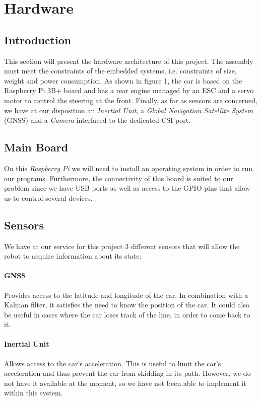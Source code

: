 \section{Hardware}

\subsection{Introduction}

This section will present the hardware architecture of this project. The assembly must meet the constraints of the embedded
systems, i.e. constraints of size, weight and power consumption. As shown in
figure 1, the car is based on the Raspberry Pi 3B+ board and has a rear engine
managed by an ESC and a servo motor to control the steering at the front. Finally,
as far as sensors are concerned, we have at our disposition an \textit{Inertial Unit}, a 
\textit{Global Navigation Satellite System} (GNSS) and a \textit{Camera}
interfaced to the dedicated CSI port.


\subsection{Main Board}

On this \textit{Raspberry Pi} we will need to install an operating system in order
to run our programs. Furthermore, the connectivity of this board is suited to our
problem since we have USB ports as well as access to the GPIO pins that allow us
to control several devices.

\subsection{Sensors}
We have at our service for this project 3 different sensors that will allow the robot
to acquire information about its state: 

\paragraph{GNSS}
Provides access to the latitude and longitude of the car. In combination with a Kalman filter, it satisfies the need to know the position of the car. It could also be useful in cases where the car loses track of the line, in order to come back to it.

\paragraph{Inertial Unit}
Allows access to the car's acceleration. This is useful to limit the car's acceleration and thus prevent the car from skidding in its path. However, we do not have it available at the moment, so we have not been able to implement it within this system.

